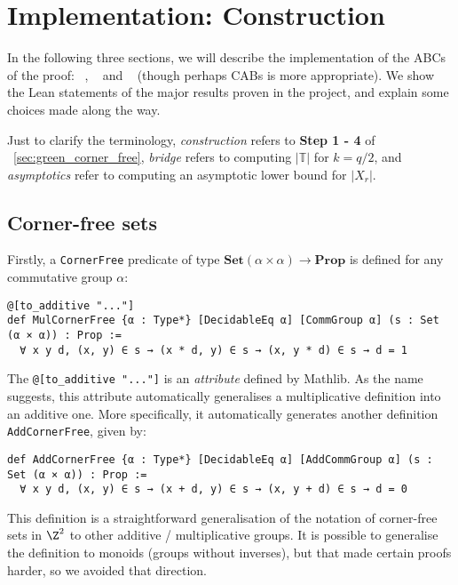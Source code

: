 \section{Implementation: Construction} \label{sec:impl_construction}

In the following three sections, we will describe the implementation of the ABCs of the proof: ~, ~ and ~ (though perhaps CABs is more appropriate). We show the Lean statements of the major results proven in the project, and explain some choices made along the way.

Just to clarify the terminology, \textit{construction} refers to \textbf{Step 1 - 4} of ~\cref{sec:green_corner_free}, \textit{bridge} refers to computing \(|\mathbb{T}|\) for \(k = q / 2\), and \textit{asymptotics} refer to computing an asymptotic lower bound for \(|X_r|\).

\subsection{Corner-free sets}

Firstly, a \texttt{CornerFree} predicate of type \(\mathbf{Set} (\alpha \times \alpha) \to \mathbf{Prop}\) is defined for any commutative group \(\alpha\):

\begin{verbatim}
@[to_additive "..."]
def MulCornerFree {α : Type*} [DecidableEq α] [CommGroup α] (s : Set (α × α)) : Prop :=
  ∀ x y d, (x, y) ∈ s → (x * d, y) ∈ s → (x, y * d) ∈ s → d = 1
\end{verbatim}

The \texttt{@[to_additive "..."]} is an \textit{attribute} defined by Mathlib. As the name suggests, this attribute automatically generalises a multiplicative definition into an additive one. More specifically, it automatically generates another definition \texttt{AddCornerFree}, given by:

\begin{verbatim}
def AddCornerFree {α : Type*} [DecidableEq α] [AddCommGroup α] (s : Set (α × α)) : Prop :=
  ∀ x y d, (x, y) ∈ s → (x + d, y) ∈ s → (x, y + d) ∈ s → d = 0
\end{verbatim}

This definition is a straightforward generalisation of the notation of corner-free sets in \(\Z^2\) to other additive / multiplicative groups. It is possible to generalise the definition to monoids (groups without inverses), but that made certain proofs harder, so we avoided that direction.

